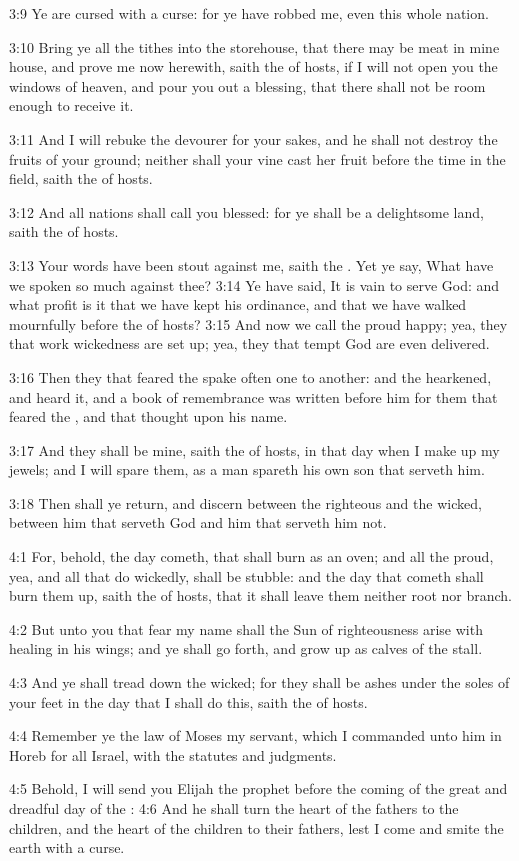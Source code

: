 3:9 Ye are cursed with a curse: for ye have robbed me, even this whole nation.

3:10 Bring ye all the tithes into the storehouse, that there may be meat in mine house, and prove me now herewith, saith the \LORD of hosts, if I will not open you the windows of heaven, and pour you out a blessing, that there shall not be room enough to receive it.

3:11 And I will rebuke the devourer for your sakes, and he shall not destroy the fruits of your ground; neither shall your vine cast her fruit before the time in the field, saith the \LORD of hosts.

3:12 And all nations shall call you blessed: for ye shall be a delightsome land, saith the \LORD of hosts.

3:13 Your words have been stout against me, saith the \LORD. Yet ye say, What have we spoken so much against thee?  3:14 Ye have said, It is vain to serve God: and what profit is it that we have kept his ordinance, and that we have walked mournfully before the \LORD of hosts?  3:15 And now we call the proud happy; yea, they that work wickedness are set up; yea, they that tempt God are even delivered.

3:16 Then they that feared the \LORD spake often one to another: and the \LORD hearkened, and heard it, and a book of remembrance was written before him for them that feared the \LORD, and that thought upon his name.

3:17 And they shall be mine, saith the \LORD of hosts, in that day when I make up my jewels; and I will spare them, as a man spareth his own son that serveth him.

3:18 Then shall ye return, and discern between the righteous and the wicked, between him that serveth God and him that serveth him not.

4:1 For, behold, the day cometh, that shall burn as an oven; and all the proud, yea, and all that do wickedly, shall be stubble: and the day that cometh shall burn them up, saith the \LORD of hosts, that it shall leave them neither root nor branch.

4:2 But unto you that fear my name shall the Sun of righteousness arise with healing in his wings; and ye shall go forth, and grow up as calves of the stall.

4:3 And ye shall tread down the wicked; for they shall be ashes under the soles of your feet in the day that I shall do this, saith the \LORD of hosts.

4:4 Remember ye the law of Moses my servant, which I commanded unto him in Horeb for all Israel, with the statutes and judgments.

4:5 Behold, I will send you Elijah the prophet before the coming of the great and dreadful day of the \LORD: 4:6 And he shall turn the heart of the fathers to the children, and the heart of the children to their fathers, lest I come and smite the earth with a curse.


